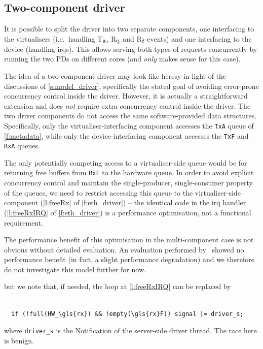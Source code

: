 \documentclass[a4paper,12pt]{report}
\newcommand{\code}[1]{\texttt{#1}}
\newcommand{\Ta}{T\(_{\mbox{\footnotesize a}}\)\xspace}
\newcommand{\Rq}{R\(_{\mbox{\footnotesize q}}\)\xspace}
\newcommand{\Rf}{R\(_{\mbox{\footnotesize f}}\)\xspace}
\begin{document}
\subsection{Two-component driver}

It is possible to split the driver into two separate components,
one interfacing to the virtualisers (i.e.\ handling \Ta, \Rq and \Rf events)
and one interfacing to the device (handling \glspl{irq}). This allows
serving both types of requests concurrently by running the two PDs
on different cores (and \emph{only} makes sense for this case).

The idea of a two-component driver may look like heresy in light of the discussions of
\autoref{s:model_driver}, specifically the stated goal of avoiding
error-prone concurrency control inside the driver. However, it is
actually a straightforward extension and does \emph{not} require
extra concurrency control inside the driver. The two driver components do
not access the same software-provided data structures. Specifically,
only the virtualiser-interfacing component
accesses the \code{TxA} queue of \autoref{f:metadata}, while only the
device-interfacing component accesses the \code{TxF} and \code{RxA}
queues.

The only potentially competing access to a virtualiser-side queue would be for returning free
buffers from \code{RxF} to the hardware queue. In order to avoid
explicit concurrency control and maintain the single-producer,
single-consumer property of the queues, we need to restrict accessing
this queue to the virtualiser-side component (\autoref{l:freeRx}
of \autoref{f:eth_driver}) -- the identical code in the \gls{irq} handler
(\autoref{l:freeRxIRQ} of \autoref{f:eth_driver}) is a performance
optimisation, not a functional requirement.

The performance benefit of this optimisation in the multi-component
case is not obvious without detailed evaluation. An evaluation
performed by~\citet[Sect.~7.4.3]{Parker:bsc} showed no performance
benefit (in fact, a slight performance degradation) and we therefore
do not investigate this model further for now.

\iffalse
but we note that, if needed, the loop at
\autoref{l:freeRxIRQ} can be replaced by
\begin{lstlisting}[gobble=2, numbers=none] %,firstnumber=\ref{l:free\gls{rx}IRQ}]

  if (!full(HW_\gls{rx}) && !empty(\gls{rx}F)) signal |= driver_s;
\end{lstlisting}
where \code{driver\_s} is the Notification of the server-side driver
thread. The race here is benign.
\end{document}
